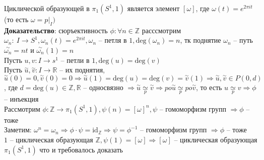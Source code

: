 	Циклической образующей в ${\pi}_1 (S^1, 1)$ является элемент $[\omega]$, где ${\omega} (t) = e^{2\pi it}$ (то есть $\omega = {p|}_I)$\\
	\textbf{Доказательство}: сюръективность $\phi: \forall n\in \mathbb{Z}$ расссмотрим ${\omega}_n:\ I \rightarrow S^1, {\omega}_n (t) = e^{2\pi it}, {\omega}_n$ -- петля в $1, \text{deg}({\omega}_n) = n$, тк поднятие ${\omega}_n$ -- путь $\overset{\sim}{{\omega}_n} = nt$ и $\overset{\sim}{{\omega}_n} (1) = n$\\
	Пусть $u,v: I \rightarrow s^1$ -- петли в $1, \text{deg}(u) = \text{deg}(v)$\\
	Пусть $\overset{\sim}{u},\overset{\sim}{v}: I \rightarrow \mathbb{R}$ -- их поднятия, $\overset{\sim}{u} (0) = 0, \overset{\sim}{v} (0) = 0 \Rightarrow \overset{\sim}{u} (1) = \text{deg}(u) = \text{deg}(v) = \overset{\sim}{v} (1) \Rightarrow \overset{\sim}{u}, \overset{\sim}{v} \in P(0,d)$, где $d = \text{deg}(u) \in \mathbb{Z}, \mathbb{R}$ -- односвязно $\Rightarrow \overset{\sim}{u} \underset{p}{\simeq} \overset{\sim}{v} \Rightarrow po \overset{\sim}{u} \underset{p}{\simeq} po \overset{\sim}{v}$, то есть $u \underset{p}{\simeq} v \Rightarrow \phi$ -- инъекция\\
	Рассмотрим $\phi: \mathbb{Z} \rightarrow {\pi}_1 (S^1, 1), \psi (n) = [\omega]^n , \psi$ -- гомоморфизм групп $\Rightarrow \phi$ -- тоже\\
	Заметим: ${\omega}^n = {\omega}_n \Rightarrow \phi \cdot \psi =  \text{id}_{\mathbb{Z}} \Rightarrow \psi = {\phi}^{-1}$ -- гомоморфизм групп $\Rightarrow \phi$ -- тоже\\
	$1$ -- циклическая образующая $\mathbb{Z}, \psi (1) = [\omega] \Rightarrow [\omega]$ -- циклическая образующая ${\pi}_1 (S^1, 1)$ что и требовалось доказать
	
	

\newpage
